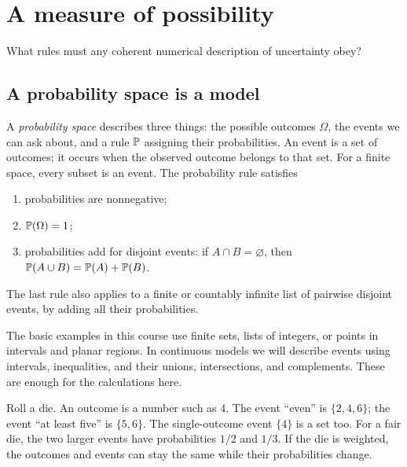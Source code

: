 \chapter{A measure of possibility}
\label{ch:probability-spaces}

\begin{question}
What rules must any coherent numerical description of uncertainty obey?
\end{question}

\section{A probability space is a model}

\begin{definition}
A \emph{probability space} describes three things: the possible outcomes
$\Omega$, the events we can ask about, and a rule $\P$ assigning their
probabilities. An event is a set of outcomes; it occurs when the observed
outcome belongs to that set. For a finite space, every subset is an event.
The probability rule satisfies
\begin{enumerate}
  \item probabilities are nonnegative;
  \item $\P(\Omega)=1$;
  \item probabilities add for disjoint events: if $A\cap B=\varnothing$,
  then $\P(A\cup B)=\P(A)+\P(B)$.
\end{enumerate}
The last rule also applies to a finite or countably infinite list of
pairwise disjoint events, by adding all their probabilities.
\end{definition}

The basic examples in this course use finite sets, lists of integers,
or points in intervals and planar regions. In continuous models we will
describe events using intervals, inequalities, and their unions,
intersections, and complements. These are enough for the calculations here.

\begin{example}
Roll a die. An outcome is a number such as $4$. The event ``even'' is
$\{2,4,6\}$; the event ``at least five'' is $\{5,6\}$.
The single-outcome event $\{4\}$ is a set too. For a fair die,
the two larger events have probabilities $1/2$ and $1/3$.
If the die is weighted, the outcomes and events can stay the same while
their probabilities change.
\end{example}

